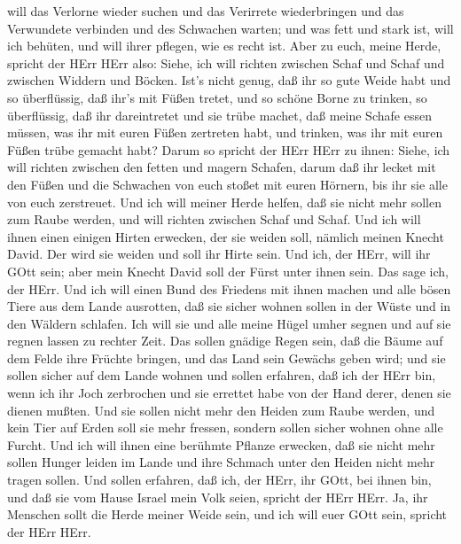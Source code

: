 will das Verlorne wieder suchen und das Verirrete wiederbringen und das
Verwundete verbinden und des Schwachen warten; und was fett und stark
ist, will ich behüten, und will ihrer pflegen, wie es recht ist.
 Aber zu euch, meine Herde, spricht der HErr HErr also:
Siehe, ich will richten zwischen Schaf und Schaf und zwischen Widdern
und Böcken.  Ist's nicht genug, daß ihr so gute Weide habt
und so überflüssig, daß ihr's mit Füßen tretet, und so schöne Borne zu
trinken, so überflüssig, daß ihr dareintretet und sie trübe machet,
 daß meine Schafe essen müssen, was ihr mit euren Füßen
zertreten habt, und trinken, was ihr mit euren Füßen trübe gemacht habt?
 Darum so spricht der HErr HErr zu ihnen: Siehe, ich will
richten zwischen den fetten und magern Schafen,  darum daß
ihr lecket mit den Füßen und die Schwachen von euch stoßet mit euren
Hörnern, bis ihr sie alle von euch zerstreuet.  Und ich
will meiner Herde helfen, daß sie nicht mehr sollen zum Raube werden,
und will richten zwischen Schaf und Schaf.  Und ich will
ihnen einen einigen Hirten erwecken, der sie weiden soll, nämlich meinen
Knecht David. Der wird sie weiden und soll ihr Hirte sein. 
Und ich, der HErr, will ihr GOtt sein; aber mein Knecht David soll der
Fürst unter ihnen sein. Das sage ich, der HErr.  Und ich
will einen Bund des Friedens mit ihnen machen und alle bösen Tiere aus
dem Lande ausrotten, daß sie sicher wohnen sollen in der Wüste und in
den Wäldern schlafen.  Ich will sie und alle meine Hügel
umher segnen und auf sie regnen lassen zu rechter Zeit. Das sollen
gnädige Regen sein,  daß die Bäume auf dem Felde ihre
Früchte bringen, und das Land sein Gewächs geben wird; und sie sollen
sicher auf dem Lande wohnen und sollen erfahren, daß ich der HErr bin,
wenn ich ihr Joch zerbrochen und sie errettet habe von der Hand derer,
denen sie dienen mußten.  Und sie sollen nicht mehr den
Heiden zum Raube werden, und kein Tier auf Erden soll sie mehr fressen,
sondern sollen sicher wohnen ohne alle Furcht.  Und ich
will ihnen eine berühmte Pflanze erwecken, daß sie nicht mehr sollen
Hunger leiden im Lande und ihre Schmach unter den Heiden nicht mehr
tragen sollen.  Und sollen erfahren, daß ich, der HErr, ihr
GOtt, bei ihnen bin, und daß sie vom Hause Israel mein Volk seien,
spricht der HErr HErr.  Ja, ihr Menschen sollt die Herde
meiner Weide sein, und ich will euer GOtt sein, spricht der HErr HErr.

